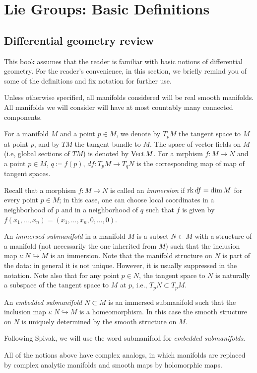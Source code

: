 \chapter{Lie Groups: Basic Definitions}
\section{Differential geometry review}
This book assumes that the reader is familiar with basic notions of
differential geometry. For the reader's convenience, in this section, we
briefly remind you of some of the definitions and fix notation for further
use.

Unless otherwise specified, all manifolds considered will be real smooth
manifolds. All manifolds we will consider will have at most countably many
connected components.

For a manifold $M$ and a point $p\in M$, we denote by $T_pM$ the tangent
space to $M$ at point $p$, and by $TM$ the tangent bundle to $M$. The space
of vector fields on $M$ (i.e, global sections of $TM$) is denoted by
$\operatorname{Vect} M$. For a mrphism $f\colon M\to N$ and a point $p\in M$,
$q\coloneq f(p)$, $df\colon T_pM\to T_qN$ is the corresponding map of map
of tangent spaces.

Recall that a morphism $f\colon M\to N$ is called an \emph{immersion} if
$\operatorname{rk} df=\dim M$ for every point $p\in M$; in this case, one can choose
local coordinates in a neighborhood of $p$ and in a neighborhood of $q$
such that $f$ is given by $f(x_1,\dotsc,x_n)=(x_1,\dotsc,x_n,0,\dotsc,0)$.

An \emph{immersed submanifold} in a manifold $M$ is a subset $N\subset M$
with a structure of a manifold (not necessarily the one inherited from $M$)
such that the inclusion map $\iota\colon N\hookrightarrow M$ is an
immersion. Note that the manifold structure on $N$ is part of the data: in
general it is not unique. However, it is usually suppressed in the
notation. Note also that for any point $p\in N$, the tangent space to $N$
is naturally a subspace of the tangent space to $M$ at $p$, i.e.,
$T_pN\subset T_pM$.

An \emph{embedded submanifold $N\subset M$} is an immersed submanifold such
that the inclusion map $\iota\colon N\hookrightarrow M$ is a
homeomorphism. In this case the smooth structure on $N$ is uniquely
determined by the smooth structure on $M$.

Following Spivak, we will use the word submanifold for \emph{embedded
  submanifolds}.

All of the notions above have complex analogs, in which manifolds are
replaced by complex analytic manifolds and smooth maps by holomorphic maps.

